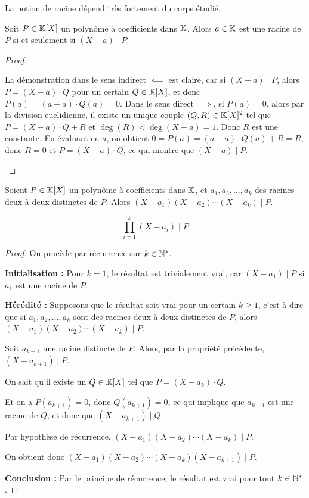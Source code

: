 \documentclass[12pt, a4paper]{report}
\begin{document}
\begin{remark}
    La notion de racine dépend très fortement du corps étudié.
\end{remark}

\begin{property}
    Soit $P \in \mathbb{K}[X]$ un polynôme à coefficients dans $\mathbb{K}$. Alors $a \in \mathbb{K}$ est une racine de $P$ si et seulement si $(X-a) \mid P$.
\end{property}

\begin{proof}
    \begin{outline}
        \1 La démonstration dans le sens indirect $\impliedby$ est claire, car si $(X-a) \mid P$, alors $P = (X-a) \cdot Q$ pour un certain $Q \in \mathbb{K}[X]$, et donc $P(a) = (a-a) \cdot Q(a) = 0$.
        \1 Dans le sens direct $\implies$, si $P(a) = 0$, alors par la division euclidienne, il existe un unique couple $(Q,R) \in \mathbb{K}[X]^2$ tel que $P = (X-a) \cdot Q + R$ et $\deg(R) < \deg(X-a) = 1$. Donc $R$ est une constante. En évaluant en $a$, on obtient $0 = P(a) = (a-a) \cdot Q(a) + R = R$, donc $R = 0$ et $P = (X-a) \cdot Q$, ce qui montre que $(X-a) \mid P$.
    \end{outline}
\end{proof}

\begin{consequence}
    Soient $P \in \mathbb{K}[X]$ un polynôme à coefficients dans $\mathbb{K}$, et $a_1, a_2, \ldots, a_k$ des racines deux à deux distinctes de $P$. Alors $(X-a_1)(X-a_2)\cdots(X-a_k) \mid P$.

    $$\prod_{i=1}^{k}(X-a_i) \mid P$$
\end{consequence}

\begin{proof}
    On procède par récurrence sur $k \in \mathbb{N}^*$.
    
    \textbf{Initialisation :} Pour $k = 1$, le résultat est trivialement vrai, car $(X-a_1) \mid P$ si $a_1$ est une racine de $P$.

    \textbf{Hérédité :} Supposons que le résultat soit vrai pour un certain $k \ge 1$, c'est-à-dire que si $a_1, a_2, \ldots, a_k$ sont des racines deux à deux distinctes de $P$, alors $(X-a_1)(X-a_2)\cdots(X-a_k) \mid P$.
    
    Soit $a_{k+1}$ une racine distincte de $P$. Alors, par la propriété précédente, $(X-a_{k+1}) \mid P$.

    On sait qu'il existe un $Q \in \mathbb{K}[X]$ tel que $P = (X-a_{k}) \cdot Q$.

    Et on a $P(a_{k+1}) = 0$, donc $Q(a_{k+1}) = 0$, ce qui implique que $a_{k+1}$ est une racine de $Q$, et donc que $(X-a_{k+1}) \mid Q$.
    
    Par hypothèse de récurrence, $(X-a_1)(X-a_2)\cdots(X-a_k) \mid P$. 

    On obtient donc $(X-a_1)(X-a_2)\cdots(X-a_k)(X-a_{k+1}) \mid P$.

    \textbf{Conclusion :} Par le principe de récurrence, le résultat est vrai pour tout $k \in \mathbb{N}^*$.
\end{proof}
\end{document}

